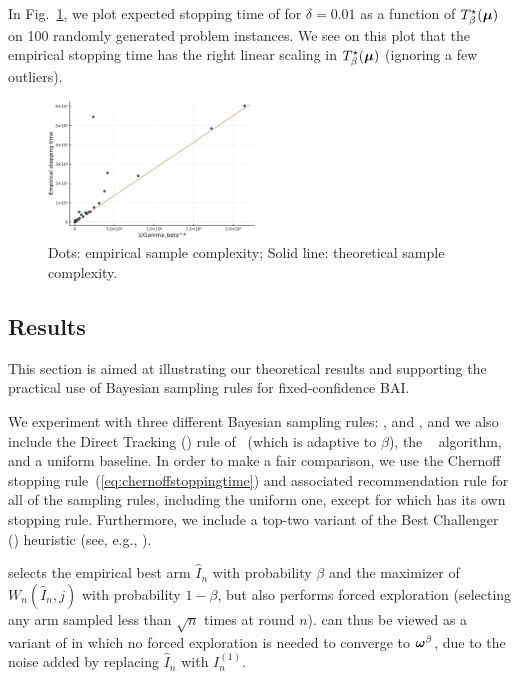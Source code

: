 In Fig.~\ref{fig:t3c.hardness}, we plot expected stopping time of \TCC for $\delta = 0.01$ as a function of $T_{\beta}^\star({\boldsymbol \mu})$ on 100 randomly generated problem instances. We see on this plot that the empirical stopping time has the right linear scaling in $T_{\beta}^\star({\boldsymbol \mu})$ (ignoring a few outliers).

\begin{figure}[ht]
    \centering
    \includegraphics[width=0.49\textwidth]{Chapter3/img/hardness.pdf}
    \caption{Dots: empirical sample complexity; Solid line: theoretical sample complexity.}
    \label{fig:t3c.hardness}
\end{figure}

\subsection{Results}\label{sec:t3c.experiments.results}
This section is aimed at illustrating our theoretical results and supporting the practical use of Bayesian sampling rules for fixed-confidence BAI.   %

We experiment with three different Bayesian sampling rules: \TCC, \TTTS and \TTEI, and we also include the Direct Tracking (\DT) rule of~\cite{garivier2016tracknstop} (which is adaptive to $\beta$), the \UGapE~\citep{gabillon2012ugape} algorithm, and a uniform baseline. In order to make a fair comparison, we use the Chernoff stopping rule~(\ref{eq:chernoffstoppingtime}) and associated recommendation rule for all of the sampling rules, including the uniform one, except for \UGapE which has its own stopping rule. Furthermore, we include a top-two variant of the Best Challenger (\BC) heuristic (see, e.g., \citealp{menard2019lma}). 

\BC selects the empirical best arm $\hat{I}_n$ with probability $\beta$ and the maximizer of $W_n(\hat{I}_n,j)$ with probability $1-\beta$, but also performs forced exploration (selecting any arm sampled less than $\sqrt{n}$ times at round $n$). \TCC can thus be viewed as a variant of \BC in which no forced exploration is needed to converge to ${\boldsymbol \omega}^\beta$, due to the noise added by replacing $\hat{I}_n$ with $I_n^{(1)}$.

